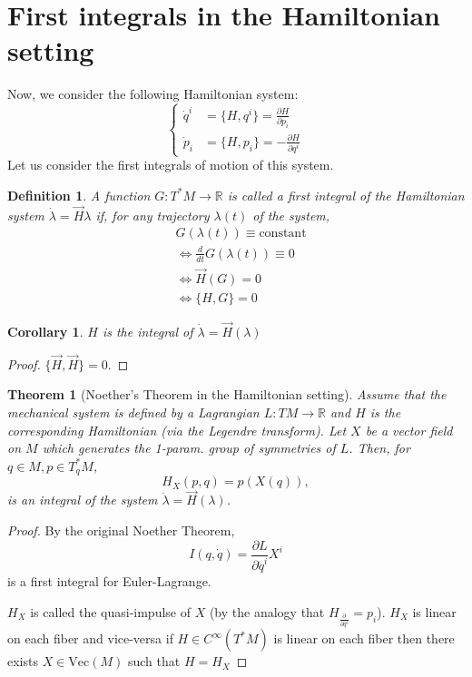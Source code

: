 \documentclass{article}
\newcommand{\R}{\mathbb R}
\newcommand{\pd}[1]{\frac{\partial}{\partial #1}}
\newcommand{\pdof}[2]{\frac{\partial #1}{\partial #2}}
\newtheorem{thm}{Theorem}
\newtheorem{defn}{Definition}
\newtheorem{cor}{Corollary}
\begin{document}
\section{First integrals in the Hamiltonian setting}
Now, we consider the following Hamiltonian system:
\[\left\{\begin{aligned}
    \dot q^i &= \{H,q^i\} = \pdof{H}{p_i} \\
    \dot p_i &= \{H,p_i\} = -\pdof{H}{q^i}
\end{aligned}\right.\]
Let us consider the first integrals of motion of this system.
\begin{defn}
    A function $G:T^*M\to \R$ is called a first integral of the Hamiltonian system $\dot\lambda = \vec{H} \lambda$ if, for any trajectory $\lambda(t)$ of the system,
    \begin{align*}
        &G(\lambda(t)) \equiv \text{constant}\\
        &\Leftrightarrow \frac{d}{dt}G(\lambda(t))\equiv 0\\
        &\Leftrightarrow \vec{H}(G) = 0\\
        &\Leftrightarrow \{H,G\} = 0
    \end{align*}
\end{defn}
\begin{cor}
    $H$ is the integral of $\dot \lambda = \vec H(\lambda)$
\end{cor}
\begin{proof}
    $\{\vec H,\vec H\} = 0$.
\end{proof}
\begin{thm}[Noether's Theorem in the Hamiltonian setting]
    Assume that the mechanical system is defined by a Lagrangian $L:TM\to \R$ and $H$ is the corresponding Hamiltonian (via the Legendre transform). Let $X$ be a vector field on $M$ which generates the 1-param. group of symmetries of $L$. Then, for $q\in M, p\in T_q^*M$,
    \[H_X(p,q) = p(X(q)),\]
    is an integral of the system $\dot \lambda = \vec H(\lambda)$.
\end{thm}
\begin{proof}
    By the original Noether Theorem,
    \[I(q,\dot q) = \pdof{L}{\dot q^i}X^i\]
    is a first integral for Euler-Lagrange.

    $H_X$ is called the quasi-impulse of $X$ (by the analogy that $H_{\pd{q^i}} = p_i$). $H_X$ is linear on each fiber and vice-versa if $H\in C^\infty(T^*M)$ is linear on each fiber then there exists $X\in \text{Vec}(M)$ such that $H=H_X$
\end{proof}
\end{document}
